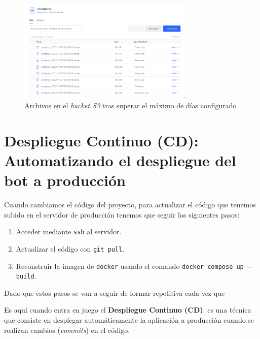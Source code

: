 \begin{figure}[h]
\centering
\includegraphics[width=0.75\textwidth]{imagenes/implementacion/backup_despues_borrado_automatico.png}
\caption{Archivos en el \textit{bucket S3} tras superar el máximo de días configurado}
\label{fig:backup2}
\end{figure}




\section{Despliegue Continuo (CD): Automatizando el despliegue del bot a producción}



Cuando cambiamos el código del proyecto, para actualizar el código que tenemos subido en el servidor de producción tenemos que seguir los siguientes pasos:

\begin{enumerate}
    \item Acceder mediante \texttt{ssh} al servidor.
    \item Actualizar el código con \texttt{git pull}.
    \item Reconstruir la imagen de \texttt{docker} usando el comando \texttt{docker compose up --build}.
\end{enumerate}

Dado que estos pasos se van a seguir de formar repetitiva cada vez que 

Es aquí cuando entra en juego el \textbf{Despliegue Continuo (CD)}: es una técnica que consiste en desplegar automáticamente la aplicación a producción cuando se realizan cambios (\textit{commits}) en el código\cite{Shahin_2017}. 

